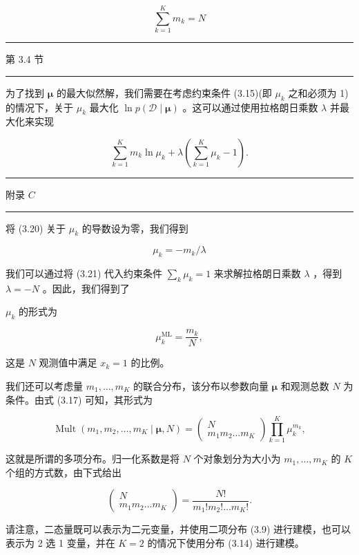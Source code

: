 \documentclass[10pt]{article}
\newcommand{\HRule}{\begin{center}\rule{0.9\linewidth}{0.2mm}\end{center}}
\begin{document}
\[
\mathop{\sum }\limits_{{k = 1}}^{K}{m}_{k} = N \tag{3.19}
\]

\HRule

第 3.4 节

\HRule

为了找到 \(\mathbf{\mu }\) 的最大似然解，我们需要在考虑约束条件 (3.15)(即 \({\mu }_{k}\) 之和必须为 1)的情况下，关于 \({\mu }_{k}\) 最大化 \(\ln p\left( {\mathcal{D} \mid  \mathbf{\mu }}\right)\) 。这可以通过使用拉格朗日乘数 \(\lambda\) 并最大化来实现

\[
\mathop{\sum }\limits_{{k = 1}}^{K}{m}_{k}\ln {\mu }_{k} + \lambda \left( {\mathop{\sum }\limits_{{k = 1}}^{K}{\mu }_{k} - 1}\right) . \tag{3.20}
\]

\HRule

附录 \(C\)

\HRule

将 (3.20) 关于 \({\mu }_{k}\) 的导数设为零，我们得到

\[
{\mu }_{k} =  - {m}_{k}/\lambda  \tag{3.21}
\]

我们可以通过将 (3.21) 代入约束条件 \(\mathop{\sum }\limits_{k}{\mu }_{k} = 1\) 来求解拉格朗日乘数 \(\lambda\) ，得到 \(\lambda  =  - N\) 。因此，我们得到了

\({\mu }_{k}\) 的形式为

\[
{\mu }_{k}^{\mathrm{{ML}}} = \frac{{m}_{k}}{N}, \tag{3.22}
\]

这是 \(N\) 观测值中满足 \({x}_{k} = 1\) 的比例。

我们还可以考虑量 \({m}_{1},\ldots ,{m}_{K}\) 的联合分布，该分布以参数向量 \(\mathbf{\mu }\) 和观测总数 \(N\) 为条件。由式 (3.17) 可知，其形式为

\[
\operatorname{Mult}\left( {{m}_{1},{m}_{2},\ldots ,{m}_{K} \mid  \mathbf{\mu },N}\right)  = \left( \begin{matrix} N \\  {m}_{1}{m}_{2}\ldots {m}_{K} \end{matrix}\right) \mathop{\prod }\limits_{{k = 1}}^{K}{\mu }_{k}^{{m}_{k}}, \tag{3.23}
\]

这就是所谓的多项分布。归一化系数是将 \(N\) 个对象划分为大小为 \({m}_{1},\ldots ,{m}_{K}\) 的 \(K\) 个组的方式数，由下式给出

\[
\left( \begin{matrix} N \\  {m}_{1}{m}_{2}\ldots {m}_{K} \end{matrix}\right)  = \frac{N!}{{m}_{1}!{m}_{2}!\ldots {m}_{K}!}. \tag{3.24}
\]

请注意，二态量既可以表示为二元变量，并使用二项分布 (3.9) 进行建模，也可以表示为 2 选 1 变量，并在 \(K = 2\) 的情况下使用分布 (3.14) 进行建模。
\end{document}
